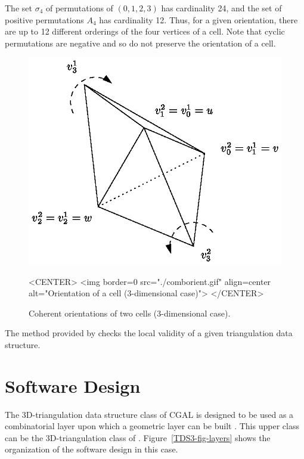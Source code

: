 The set {\Large $\sigma$}$_4$ of permutations of
$(0,1,2,3)$ has cardinality 24, and the set of positive permutations
$A_4$ has cardinality 12. Thus, for a given orientation, there
are up to 12 different orderings of the four vertices of a cell. Note
that cyclic permutations are negative and so do not preserve the
orientation of a cell.

\begin{figure}[htbp]
\begin{ccTexOnly}
\begin{center} 
\includegraphics{comborient.eps} 
\end{center}
\end{ccTexOnly}
\caption{Coherent orientations of two cells (3-dimensional case).
\label{TDS3-fig-comborient}}
\begin{ccHtmlOnly}
<CENTER>
<img border=0 src="./comborient.gif" align=center alt="Orientation of a cell (3-dimensional case)">
</CENTER>
\end{ccHtmlOnly}
\end{figure} 

The  method provided by
 checks the local validity of a
given triangulation data structure.
 
\section{Software Design}
\label{TDS3-sec-design}

The 3D-triangulation data structure class of CGAL is designed to be
used as a combinatorial layer upon which a geometric layer can be
built \cite{k-ddsps-98}. This upper class can be the 3D-triangulation
class of \cgal. Figure~\ref{TDS3-fig-layers} shows the organization of
the software design in this case.

